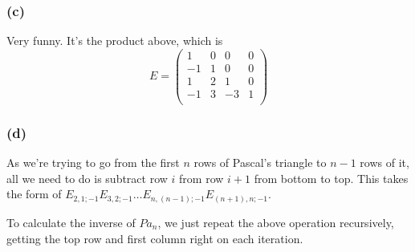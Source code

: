 \documentclass{article}
\begin{document}
\subsubsection{(c)}
Very funny. It's the product above, which is 
\[
E=\left( 
\begin{array}{cccc}
1 &0 &0 &0\\
-1&1 &0 &0\\
1 &2 &1 &0\\
-1&3 &-3&1\\
\end{array}
\right)
\]

\subsubsection{(d)}
As we're trying to go from the first $n$ rows of Pascal's triangle to $n-1$ rows
of it, all we need to do is subtract row $i$ from row $i+1$ from bottom to top.
This takes the form of
$E_{2,1;-1}E_{3,2;-1}\dots E_{n,(n-1); -1}E_{(n+1),n; -1}$.

\medskip
To calculate the inverse of $Pa_n$, we just repeat the above operation
recursively, getting the top row and first column right on each iteration.
\end{document}
